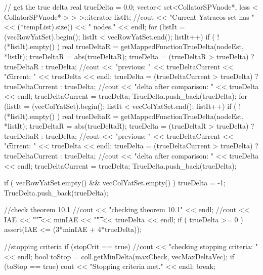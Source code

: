\begin{DoxyCode}
{{{        // get the true delta
        real trueDelta = 0.0;
        vector< set<CollatorSPVnode*, less < CollatorSPVnode* > > >::iterator 
      listIt;   
        //cout << "Current Yatracos set has " << (*tempList).size() << "
       nodes." << endl;
        for (listIt = (vecRowYatSet).begin(); listIt < vecRowYatSet.end(); 
      listIt++) {
          if ( !(*listIt).empty() ) {
            real trueDeltaR = getMappedFunctionTrueDelta(nodeEst, *listIt);
            trueDeltaR = abs(trueDeltaR);
            trueDelta = (trueDeltaR > trueDelta) ? trueDeltaR : trueDelta;
            //cout << "previous: " << trueDeltaCurrent << "\t current: " <<
       trueDelta << endl;
            trueDelta = (trueDeltaCurrent > trueDelta) ? trueDeltaCurrent : 
      trueDelta;
            //cout << "delta after comparison: " << trueDelta << endl;
            trueDeltaCurrent = trueDelta;
            TrueDelta.push_back(trueDelta);
          }
        }
        for (listIt = (vecColYatSet).begin(); listIt < vecColYatSet.end(); 
      listIt++) {
          if ( !(*listIt).empty() ) {
            real trueDeltaR = getMappedFunctionTrueDelta(nodeEst, *listIt);
            trueDeltaR = abs(trueDeltaR);
            trueDelta = (trueDeltaR > trueDelta) ? trueDeltaR : trueDelta;
            //cout << "previous: " << trueDeltaCurrent << "\t current: " <<
       trueDelta << endl;
            trueDelta = (trueDeltaCurrent > trueDelta) ? trueDeltaCurrent : 
      trueDelta;
            //cout << "delta after comparison: " << trueDelta << endl;
            trueDeltaCurrent = trueDelta;
            TrueDelta.push_back(trueDelta);
          }
        }

        if ( vecRowYatSet.empty() && vecColYatSet.empty() ) 
        { trueDelta = -1; TrueDelta.push_back(trueDelta); } 
        
        //check theorem 10.1
        //cout << "checking theorem 10.1" << endl;
        //cout << IAE << "\t" << minIAE << "\t" << trueDelta << endl;
        if ( trueDelta >= 0 ) { assert(IAE <= (3*minIAE + 4*trueDelta)); }

        //stopping criteria
        if (stopCrit == true) {
          //cout << "checking stopping criteria: " << endl;
          bool toStop = coll.getMinDelta(maxCheck, vecMaxDeltaVec);
          if (toStop == true) {
            cout << "Stopping criteria met." << endl;
            break;
          } 
        }

}}}
\end{DoxyCode}
